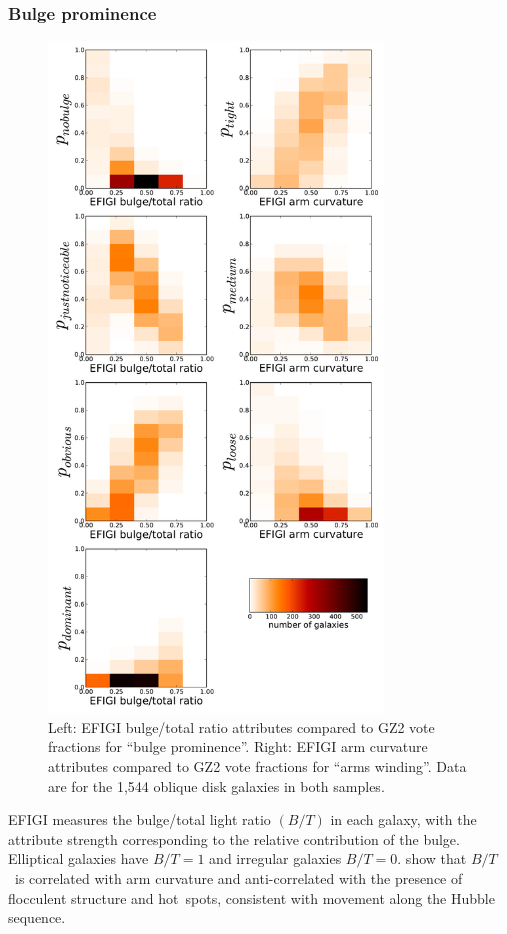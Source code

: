 \documentclass[useAMS,usenatbib]{mn2e}
\newcommand{\bt}{$B/T$}
\begin{document}
\subsubsection{Bulge prominence}

\begin{figure}
\includegraphics[angle=0,width=3.5in]{figures/efigi_bulgearms.pdf}
\caption{Left: EFIGI bulge/total ratio attributes compared to GZ2 vote fractions for ``bulge prominence''. Right: EFIGI arm curvature attributes compared to GZ2 vote fractions for ``arms winding''. Data are for the 1,544 oblique disk galaxies in both samples.  
\label{fig-efigi_bulgearms}}
\end{figure}

EFIGI measures the bulge/total light ratio $(B/T)$ in each galaxy, with the attribute strength corresponding to the relative contribution of the bulge. Elliptical galaxies have $B/T=1$ and irregular galaxies $B/T=0$. \citet{bai11} show that \bt~is correlated with arm curvature and anti-correlated with the presence of flocculent structure and hot~spots, consistent with movement along the Hubble sequence.  
\end{document}
